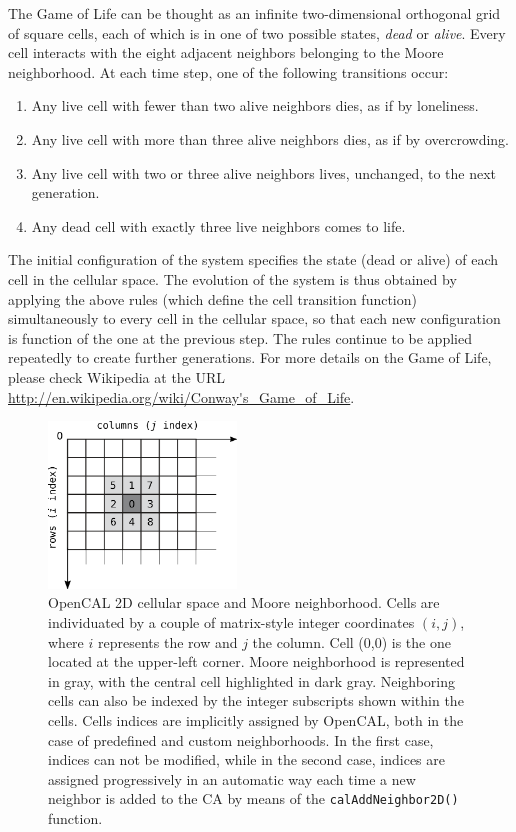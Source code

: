 The Game of Life can be thought as an infinite two-dimensional
orthogonal grid of square cells, each of which is in one of two
possible states, \emph{dead} or \emph{alive}. Every cell interacts
with the eight adjacent neighbors belonging to the Moore
neighborhood. At each time step, one of the following transitions
occur:

\begin{enumerate}
    \item Any live cell with fewer than two alive neighbors dies, as
      if by loneliness.
    \item Any live cell with more than three alive neighbors dies, as
      if by overcrowding.
    \item Any live cell with two or three alive neighbors lives,
      unchanged, to the next generation.
    \item Any dead cell with exactly three live neighbors comes to
      life.
\end{enumerate}

The initial configuration of the system specifies the state (dead or
alive) of each cell in the cellular space. The evolution of the
system is thus obtained by applying the above rules (which define the
cell transition function) simultaneously to every cell in the
cellular space, so that each new configuration is function of the one
at the previous step. The rules continue to be applied repeatedly to
create further generations. For more details on the Game of Life,
please check Wikipedia at the URL
\url{http://en.wikipedia.org/wiki/Conway's_Game_of_Life}.

\begin{figure}
  \begin{center}
    \includegraphics[width=5cm]{./images/OpenCAL/LifeNeighborhood.png}
    \caption{OpenCAL 2D cellular space and Moore neighborhood. Cells
      are individuated by a couple of matrix-style integer coordinates
      $(i, j)$, where $i$ represents the row and $j$ the column. Cell
      (0,0) is the one located at the upper-left corner. Moore
      neighborhood is represented in gray, with the central cell
      highlighted in dark gray. Neighboring cells can also be indexed by
      the integer subscripts shown within the cells. Cells indices are
      implicitly assigned by OpenCAL, both in the case of predefined
      and custom neighborhoods. In the first case, indices can not be
      modified, while in the second case, indices are assigned
      progressively in an automatic way each time a new neighbor is added
      to the CA by means of the \texttt{calAddNeighbor2D()} function.}
    \label{fig:LifeNeighborhood}
  \end{center}
\end{figure}

